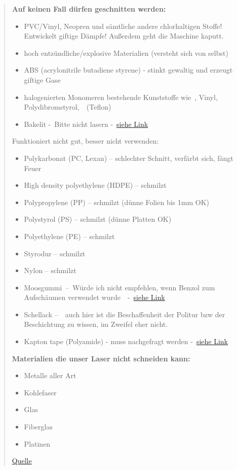 \documentclass[]{article}
\providecommand{\tightlist}{%
  \setlength{\itemsep}{0pt}\setlength{\parskip}{0pt}}
\begin{document}
\begin{quote}
\textbf{Auf keinen Fall dürfen geschnitten werden:}

\begin{itemize}
\tightlist
\item
  PVC/Vinyl, Neopren und sämtliche andere chlorhaltigen Stoffe!
  Entwickelt giftige Dämpfe! Außerdem geht die Maschine kaputt.
\item
  hoch entzündliche/explosive Materialien (versteht sich von selbst)
\item
  ABS (acrylonitrile butadiene styrene) - stinkt gewaltig und erzeugt
  giftige Gase
\item
  halogenierten Monomeren bestehende Kunststoffe wie~, Vinyl,
  Polydibromstyrol,~~(Teflon)
\item
  Bakelit -~Bitte nicht lasern
  -~\href{http://www.baubegriffe.com/Bausachverstandiger_Holzmann-Bauberatung/Blog/Eintrage/2011/10/11_122_Schadstoffe_die_unser_Leben_beeinflussen.html}{siehe
  Link}
\end{itemize}

Funktioniert nicht gut, besser nicht verwenden:

\begin{itemize}
\tightlist
\item
  Polykarbonat (PC, Lexan) -- schlechter Schnitt, verfärbt sich, fängt
  Feuer
\item
  High density polyethylene (HDPE) -- schmilzt
\item
  Polypropylene (PP) -- schmilzt (dünne Folien bis 1mm OK)
\item
  Polystyrol (PS) -- schmilzt (dünne Platten OK)
\item
  Polyethylene (PE) -- schmilzt
\item
  Styrodur -- schmilzt
\item
  Nylon -- schmilzt
\item
  Moosgummi~--~Würde ich nicht empfehlen, wenn Benzol zum Aufschäumen
  verwendet
  wurde~~-~\href{http://www.baubegriffe.com/Bausachverstandiger_Holzmann-Bauberatung/Blog/Eintrage/2011/10/11_122_Schadstoffe_die_unser_Leben_beeinflussen.html}{siehe
  Link}
\item
  Schellack --~~auch hier ist die Beschaffenheit der Politur bzw der
  Beschichtung zu wissen, im Zweifel eher nicht.
\item
  Kapton tape (Polyamide) - muss nachgefragt werden
  -~\href{http://www.potomac-laser.com/services/applications/laser-micromachining-of-dupont-kapton-polyimide/}{siehe
  Link}
\end{itemize}

\textbf{Materialien die unser Laser nicht schneiden kann:}

\begin{itemize}
\tightlist
\item
  Metalle aller Art
\item
  Kohlefaser
\item
  Glas
\item
  Fiberglas
\item
  Platinen
\end{itemize}

\href{http://wiki.fablab-muenchen.de/pages/viewpage.action?pageId=1179992}{Quelle}
\end{quote}
\end{document}
